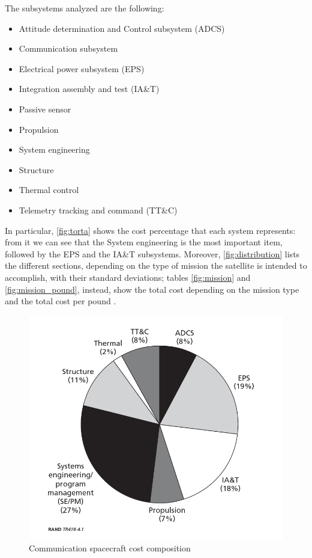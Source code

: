 \documentclass[11pt,a4paper,titlepage]{article}
\begin{document}
		The subsystems analyzed  are the following:
		\begin{itemize}
			\item Attitude determination and Control subsystem (ADCS)
			\item Communication subsystem
			\item Electrical power subsystem (EPS)
			\item Integration assembly and test (IA\&T)
			\item Passive sensor
			\item Propulsion
			\item System engineering
			\item Structure
			\item Thermal control
			\item Telemetry tracking and command (TT\&C)
		\end{itemize}
		In particular, \autoref{fig:torta} shows the cost percentage that each system represents: from it we can see that the 				System engineering is the most important item, followed by the EPS and the IA\&T subsystems. Moreover, 						\autoref{fig:distribution} lists the different sections, depending on the type of mission the satellite is intended to 					accomplish, with their standard deviations; tables \ref{fig:mission} and \ref{fig:mission_pound}, instead, show the total 			cost depending on the mission type and the total cost per pound \cite{Fox2008}.
		
		\begin{figure}
			\centering
			\includegraphics[width = .7\textwidth]{Torta.png}
			\caption{Communication spacecraft cost composition}
			\label{fig:torta}
		\end{figure}
		
\end{document}
